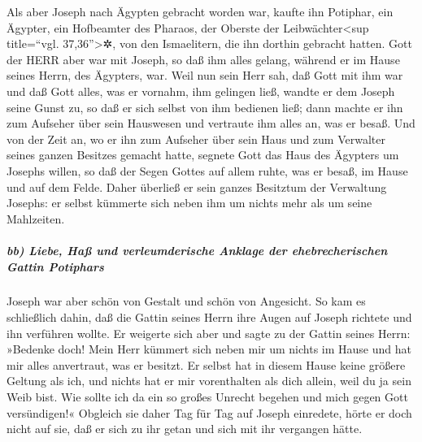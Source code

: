  Als aber Joseph nach Ägypten gebracht worden war, kaufte
ihn Potiphar, ein Ägypter, ein Hofbeamter des Pharaos, der Oberste der
Leibwächter\textless sup title=``vgl. 37,36''\textgreater✲, von den
Ismaelitern, die ihn dorthin gebracht hatten.  Gott der
HERR aber war mit Joseph, so daß ihm alles gelang, während er im Hause
seines Herrn, des Ägypters, war.  Weil nun sein Herr sah,
daß Gott mit ihm war und daß Gott alles, was er vornahm, ihm gelingen
ließ,  wandte er dem Joseph seine Gunst zu, so daß er sich
selbst von ihm bedienen ließ; dann machte er ihn zum Aufseher über sein
Hauswesen und vertraute ihm alles an, was er besaß.  Und
von der Zeit an, wo er ihn zum Aufseher über sein Haus und zum Verwalter
seines ganzen Besitzes gemacht hatte, segnete Gott das Haus des Ägypters
um Josephs willen, so daß der Segen Gottes auf allem ruhte, was er
besaß, im Hause und auf dem Felde.  Daher überließ er sein
ganzes Besitztum der Verwaltung Josephs: er selbst kümmerte sich neben
ihm um nichts mehr als um seine Mahlzeiten.

\hypertarget{bb-liebe-hauxdf-und-verleumderische-anklage-der-ehebrecherischen-gattin-potiphars}{%
\subparagraph{bb) Liebe, Haß und verleumderische Anklage der
ehebrecherischen Gattin
Potiphars}\label{bb-liebe-hauxdf-und-verleumderische-anklage-der-ehebrecherischen-gattin-potiphars}}

Joseph war aber schön von Gestalt und schön von Angesicht.
 So kam es schließlich dahin, daß die Gattin seines Herrn
ihre Augen auf Joseph richtete und ihn verführen wollte. 
Er weigerte sich aber und sagte zu der Gattin seines Herrn: »Bedenke
doch! Mein Herr kümmert sich neben mir um nichts im Hause und hat mir
alles anvertraut, was er besitzt.  Er selbst hat in diesem
Hause keine größere Geltung als ich, und nichts hat er mir vorenthalten
als dich allein, weil du ja sein Weib bist. Wie sollte ich da ein so
großes Unrecht begehen und mich gegen Gott versündigen!« 
Obgleich sie daher Tag für Tag auf Joseph einredete, hörte er doch nicht
auf sie, daß er sich zu ihr getan und sich mit ihr vergangen hätte.

